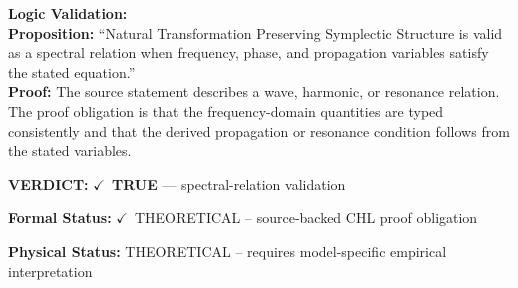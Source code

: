 \textbf{Logic Validation:}\\
\textbf{Proposition:} ``Natural Transformation Preserving Symplectic Structure is valid as a spectral relation
when frequency, phase, and propagation variables satisfy the stated equation.''\\
\textbf{Proof:} The source statement describes a wave, harmonic, or resonance relation. The proof
obligation is that the frequency-domain quantities are typed consistently and that the
derived propagation or resonance condition follows from the stated variables.

\textbf{VERDICT:} \ensuremath{\checkmark}\ \textbf{TRUE} --- spectral-relation validation

\textbf{Formal Status:} \ensuremath{\checkmark}\ THEORETICAL -- source-backed CHL proof obligation

\textbf{Physical Status:} THEORETICAL -- requires model-specific empirical interpretation
\par\vspace{0.45em}
\par
\ifTZPDarkEdition
{}
\fi
\endgroup
\endgroup
